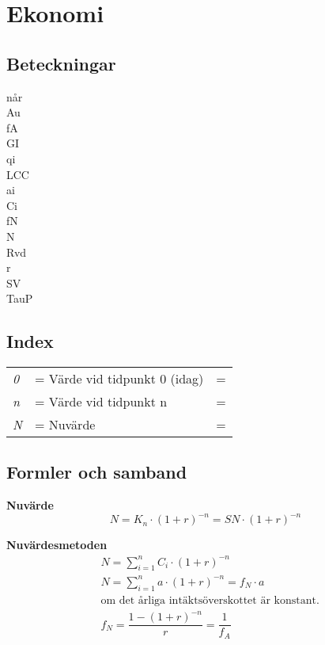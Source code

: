 \chapter{Ekonomi}
\section*{Beteckningar}
\acrfull{når}\\
\acrfull{Au}\\
\acrfull{fA}\\
\acrfull{GI}\\
\acrfull{qi}\\
\acrfull{LCC}\\
\acrfull{ai}\\
\acrfull{Ci}\\
\acrfull{fN}\\
\acrfull{N}\\
\acrfull{Rvd}\\
\acrfull{r}\\
\acrfull{SV}\\
\acrfull{TauP}

\section*{Index}
	\begin{tabularx}{\linewidth} { l
	>{\raggedright\arraybackslash\hsize=1.5\hsize\linewidth=\hsize}X
	>{\raggedright\arraybackslash\hsize=0.5\hsize\linewidth=\hsize}X}
	\textit{0} & Värde vid tidpunkt 0 (idag)\\ 
  \textit{n} & Värde vid tidpunkt n\\ 
	\textit{N} & Nuvärde 
	\end{tabularx}

\section*{Formler och samband}

\textbf{Nuvärde}
\begin{equation*}
  N=K_n \cdot (1 + r)^{-n} = SN \cdot (1 + r)^{-n}
\end{equation*}

\textbf{Nuvärdesmetoden}
\begin{align*}
  & N = \sum_{i=1}^{n} C_i \cdot (1+r)^{-n} \\
  & N = \sum_{i=1}^{n} a \cdot (1+r)^{-n} = f_N \cdot a \\
  & \text{om det årliga intäktsöverskottet är konstant.} \\
  & f_N = \dfrac{1-(1+r)^{-n}}{r} = \dfrac{1}{f_A}
\end{align*}


